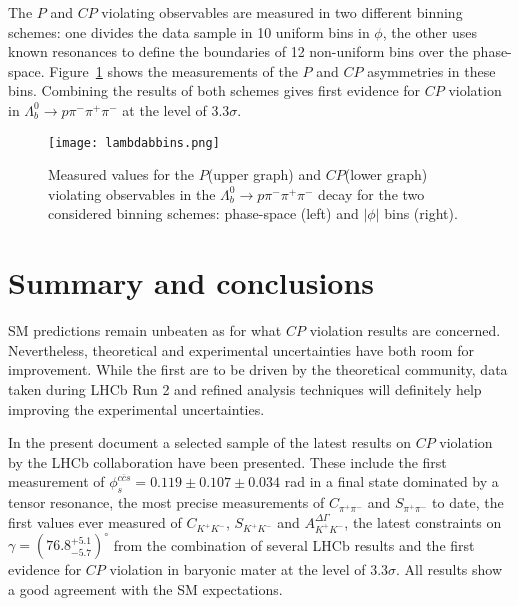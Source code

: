 \documentclass[12pt]{article}
\newcommand{\decay}[2]{\ensuremath{#1\!\to #2}\xspace}         %
\def\to                 {\ensuremath{\rightarrow}\xspace}
\def\Ppi         {\ensuremath{\pi}\xspace}
\def\Pb      {\ensuremath{b}\xspace}
\def\Pp      {\ensuremath{p}\xspace}
\def\pion   {{\ensuremath{\Ppi}}\xspace}
\def\PLambda      {\ensuremath{\Lambda}\xspace}
\def\Lz          {{\ensuremath{\PLambda}}\xspace}
\def\pip    {{\ensuremath{\pion^+}}\xspace}
\def\pim    {{\ensuremath{\pion^-}}\xspace}
\def\proton      {{\ensuremath{\Pp}}\xspace}
\def\bquark    {{\ensuremath{\Pb}}\xspace}
\def\Lb      {{\ensuremath{\Lz^0_\bquark}}\xspace}
\def\CP                {{\ensuremath{C\!P}}\xspace}
\def\P                 {{\ensuremath{\!P}}\xspace}
\def\Lbppipipi {\decay{\Lb}{\proton\pim\pip\pim}}
\begin{document}
The \P and \CP violating observables are measured in two different binning schemes: one divides the data sample in 10 uniform bins in $\phi$, the other uses known resonances to define the boundaries of 12 non-uniform bins over the phase-space. Figure~\ref{fig:acp} shows the measurements of the \P and \CP asymmetries in these bins. Combining the results of both schemes gives first evidence for \CP violation in \Lbppipipi at the level of 3.3$\sigma$.

\begin{figure}[htb]
\begin{center}
\texttt{[image: lambdabbins.png]}
\caption{Measured values for the \P (upper graph) and \CP (lower graph) violating observables in the \Lbppipipi decay for the two considered binning schemes: phase-space (left) and $|\phi|$ bins (right).}
\label{fig:acp}
\end{center}
\end{figure}

\section{Summary and conclusions}
SM predictions remain unbeaten as for what \CP violation results are concerned. Nevertheless, theoretical and experimental uncertainties have both room for improvement. While the first are to be driven by the theoretical community, data taken during LHCb Run 2 and refined analysis techniques will definitely help improving the experimental uncertainties. 

In the present document a selected sample of the latest results on \CP violation by the LHCb collaboration have been presented. These include the first measurement of $\phi_s^{c\overline{c}s} = 0.119 \pm0.107\pm0.034 $ rad in a final state dominated by a tensor resonance, the most precise measurements of $C_{\pi^+\pi^-}$ and $S_{\pi^+\pi^-}$ to date, the first values ever measured of $C_{K^+K^-}$, $S_{K^+K^-}$ and $A_{K^+K^-}^{\Delta\Gamma}$, the latest constraints on $\gamma = (76.8^{+5.1}_{-5.7})^\circ$ from the combination of several LHCb results and the first evidence for \CP violation in baryonic mater at the level of 3.3$\sigma$. All results show a good agreement with the SM expectations. 
\end{document}
